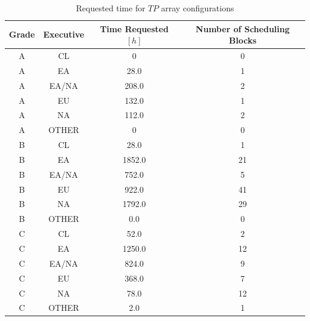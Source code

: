 \begin{table}
\begin{center}
\begin{tabular}{|c|c|c|c|}
\hline
Grade & Executive & Time Requested $[h]$ & Number of Scheduling Blocks \\ \hline
A &	CL		& 0  & 0 \\ \hline
A &	EA		& 28.0  & 1 \\ \hline
A &	EA/NA	& 208.0   & 2 \\ \hline
A & EU      & 132.0 & 1 \\ \hline 
A &	NA		& 112.0 & 2 \\ \hline
A & OTHER	& 0		& 0 \\ \hline
B  & CL 	& 28.0		& 1  \\ \hline
B  & EA     & 1852.0     & 21 \\ \hline
B  & EA/NA  & 752.0     & 5  \\ \hline
B  & EU     & 922.0     & 41 \\ \hline
B  & NA     & 1792.0    & 29 \\ \hline
B  & OTHER  & 0.0      & 0  \\ \hline
C  & CL     & 52.0     & 2  \\ \hline
C  & EA     & 1250.0     & 12  \\ \hline
C  & EA/NA  & 824.0      & 9  \\ \hline
C  & EU     & 368.0     & 7 \\ \hline
C  & NA     & 78.0     & 12 \\ \hline
C  & OTHER  & 2.0      & 1  \\ \hline
\end{tabular}
\end{center}
\caption{Requested time for $TP$ array configurations}
\label{table:requested-time-tp}
\end{table}

